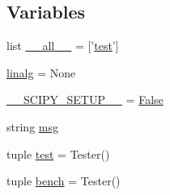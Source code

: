 \subsection*{Variables}
\begin{DoxyCompactItemize}
\item 
list \hyperlink{namespacescipy_a384992e231bb8579e603ad53fd5ffbe7}{\+\_\+\+\_\+all\+\_\+\+\_\+} = \mbox{[}'\hyperlink{namespacescipy_a70e74008e7f71f6d1523b809c579467a}{test}'\mbox{]}
\item 
\hyperlink{namespacescipy_a627dab68a298166ee420d3a6b1275963}{linalg} = None
\item 
\hyperlink{namespacescipy_a4a34452eeee824124cdc4a38f08dd61c}{\+\_\+\+\_\+\+S\+C\+I\+P\+Y\+\_\+\+S\+E\+T\+U\+P\+\_\+\+\_\+} = \hyperlink{libqhull_8h_a306ebd41c0cd1303b1372c6153f0caf8}{False}
\item 
string \hyperlink{namespacescipy_a66f2847a32f57566cf14418f8b8f90bf}{msg}
\item 
tuple \hyperlink{namespacescipy_a70e74008e7f71f6d1523b809c579467a}{test} = Tester()
\item 
tuple \hyperlink{namespacescipy_a278b283f6463f2f5cd2c9457135a8f47}{bench} = Tester()
\end{DoxyCompactItemize}


